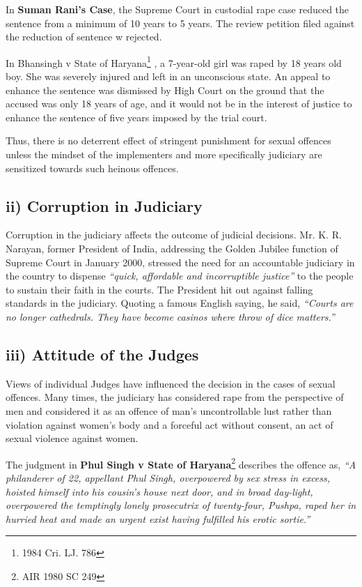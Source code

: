 \begin{multicols}{2}
\noi
In \textbf{Suman Rani's Case}, the Supreme Court in custodial rape case reduced the sentence
from a minimum of 10 years to 5 years. The review petition filed against the reduction
of sentence w rejected.	

\noi
In Bhansingh v State of Haryana\footnote{1984 Cri. LJ. 786}
, a 7-year-old girl was raped by 18 years old boy.
She was severely injured and left in an unconscious state. An appeal to enhance the
sentence was dismissed by High Court on the ground that the accused was only 18 years
of age, and it would not be in the interest of justice to enhance the sentence of five years
imposed by the trial court.

\noi
Thus, there is no deterrent effect of stringent punishment for sexual offences unless the
mindset of the implementers and more specifically judiciary are sensitized towards such
heinous offences.

\subsection*{ii) Corruption in Judiciary}

\noi
Corruption in the judiciary affects the outcome of judicial decisions. Mr. K. R. Narayan,
former President of India, addressing the Golden Jubilee function of Supreme Court in
January 2000, stressed the need for an accountable judiciary in the country to dispense \textit{“quick, affordable and incorruptible justice”} to the people to sustain their faith in the
courts. The President hit out against falling standards in the judiciary. Quoting a famous
English saying, he said, \textit{“Courts are no longer cathedrals. They have become casinos
where throw of dice matters.”}

\subsection*{iii) Attitude of the Judges}

\noi
Views of individual Judges have influenced the decision in the cases of sexual offences.
Many times, the judiciary has considered rape from the perspective of men and
considered it as an offence of man's uncontrollable lust rather than violation against
women’s body and a forceful act without consent, an act of sexual violence against
women.

\noi
The judgment in \textbf{Phul Singh v State of Haryana}\footnote{AIR 1980 SC 249} describes the offence as, \textit{“A
philanderer of 22, appellant Phul Singh, overpowered by sex stress in excess, hoisted
himself into his cousin's house next door, and in broad day-light, overpowered the
temptingly lonely prosecutrix of twenty-four, Pushpa, raped her in hurried heat and
made an urgent exist having fulfilled his erotic sortie.”}


\end{multicols}
